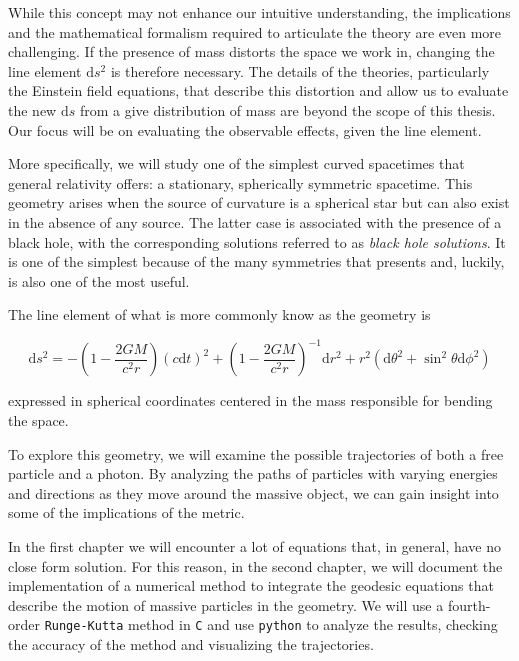 While this concept may not enhance our intuitive understanding, the
implications and the mathematical formalism required to articulate the theory
are even more challenging.
If the presence of mass distorts the space we work in, changing the line
element $\mathrm{d}s^2$ is therefore necessary.
The details of the theories, particularly the Einstein field equations, that
describe this distortion and allow us to evaluate the new $\mathrm{d}s$ from a
give distribution of mass are beyond the scope of this thesis.
Our focus will be on evaluating the observable effects, given the line
element.

More specifically, we will study one of the simplest curved spacetimes that
general relativity offers: a stationary, spherically symmetric spacetime.
This geometry arises when the source of curvature is a spherical star but can
also exist in the absence of any source. The latter case is associated with the
presence of a black hole, with the corresponding solutions referred to as
\textit{black hole solutions}.
It is one of the simplest because of the many symmetries that presents and,
luckily, is also one of the most useful.

The line element of what is more commonly know as the \Sh geometry is

\begin{equation}
	\mathrm{d}s^2 = - \left(1 - \frac{2 G M}{c^2 r} \right) (c \mathrm{d}t)^2
	+ \left(1 - \frac{2 G M}{c^2 r} \right)^{-1} \mathrm{d}r^2
	+ r^2 (\mathrm{d}\theta^2 + \sin^2 \theta \mathrm{d}\phi^2)
	\label{eq:Sh}
\end{equation}

expressed in spherical coordinates centered in the mass responsible for bending
the space.

To explore this geometry, we will examine the possible trajectories of both a
free particle and a photon. By analyzing the paths of particles with varying
energies and directions as they move around the massive object, we can gain
insight into some of the implications of the \Sh metric.

In the first chapter we will encounter a lot of equations that, in general, have
no close form solution.
For this reason, in the second chapter, we will document the implementation of
a numerical method to integrate the geodesic equations that describe the motion
of massive particles in the \Sh geometry.
We will use a fourth-order \texttt{Runge-Kutta} method in \texttt{C} and use
\texttt{python} to analyze the results, checking the accuracy of the method and
visualizing the trajectories.






